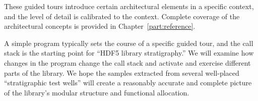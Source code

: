 
These guided tours introduce certain architectural elements in a specific context, and the level of detail is calibrated to the context. Complete coverage of the architectural concepts is provided in Chapter~\ref{part:reference}.

A simple program typically sets the course of a specific guided tour, and the call stack is the starting point for ``HDF5 library stratigraphy.'' We will examine how changes in the program change the call stack and activate and exercise different parts of the library. We hope the samples extracted from several well-placed ``stratigraphic test wells'' will create a reasonably accurate and complete picture of the library's modular structure and functional allocation.
